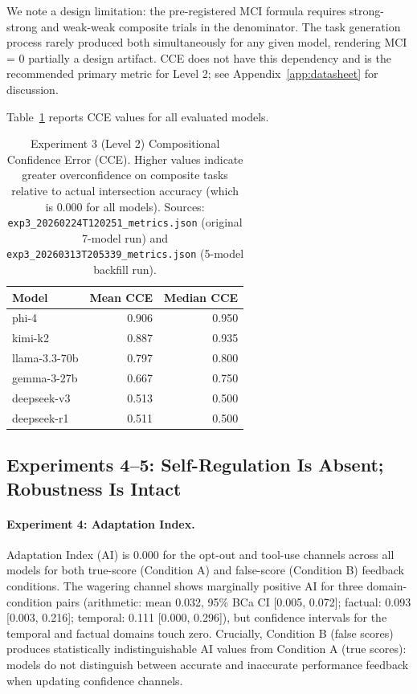 \documentclass[10pt]{article}
\newcommand{\MCI}{MCI}
\newcommand{\CCE}{CCE}
\newcommand{\AI}{AI}
\begin{document}
We note a design limitation: the pre-registered \MCI{} formula requires strong-strong
and weak-weak composite trials in the denominator. The task generation process rarely
produced both simultaneously for any given model, rendering \MCI{} = 0 partially
a design artifact. \CCE{} does not have this dependency and is the recommended
primary metric for Level 2; see Appendix~\ref{app:datasheet} for discussion.

Table~\ref{tab:exp3_cce} reports \CCE{} values for all evaluated models.

\begin{table}[t]
  \centering
  \caption{Experiment 3 (Level 2) Compositional Confidence Error (\CCE).
    Higher values indicate greater overconfidence on composite tasks relative to actual
    intersection accuracy (which is 0.000 for all models). Sources:
    \texttt{exp3\_20260224T120251\_metrics.json} (original 7-model run) and
    \texttt{exp3\_20260313T205339\_metrics.json} (5-model backfill run).}
  \label{tab:exp3_cce}
  \small
  \begin{tabular}{lrr}
    \toprule
    Model          & Mean \CCE{} & Median \CCE{} \\
    \midrule
    phi-4          & 0.906       & 0.950 \\
    kimi-k2        & 0.887       & 0.935 \\
    llama-3.3-70b  & 0.797       & 0.800 \\
    gemma-3-27b    & 0.667       & 0.750 \\
    deepseek-v3    & 0.513       & 0.500 \\
    deepseek-r1    & 0.511       & 0.500 \\
    \bottomrule
  \end{tabular}
\end{table}

\subsection{Experiments 4--5: Self-Regulation Is Absent; Robustness Is Intact}
\label{sec:results:exp45}

\paragraph{Experiment 4: Adaptation Index.}
Adaptation Index (\AI) is 0.000 for the opt-out and tool-use channels across all models
for both true-score (Condition A) and false-score (Condition B) feedback conditions.
The wagering channel shows marginally positive \AI{} for three domain-condition pairs
(arithmetic: mean 0.032, 95\% BCa CI [0.005, 0.072]; factual: 0.093 [0.003, 0.216];
temporal: 0.111 [0.000, 0.296]), but confidence intervals for the temporal and factual
domains touch zero. Crucially, Condition B (false scores) produces statistically
indistinguishable \AI{} values from Condition A (true scores): models do not distinguish
between accurate and inaccurate performance feedback when updating confidence channels.
\end{document}
